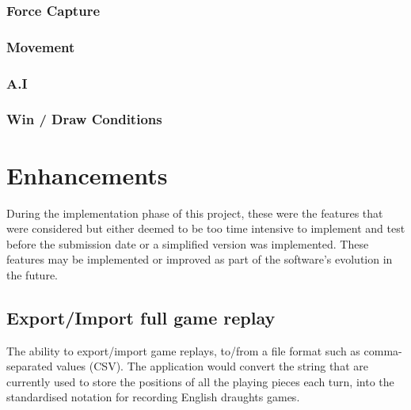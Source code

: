 \documentclass[10pt, a4paper]{article}
\begin{document}
    
    \subsubsection{Force Capture}  
    
    \subsubsection{Movement}
     
    
    \subsubsection{A.I}
    
    \subsubsection{Win / Draw Conditions}
    
    
    
    
    
    

    
    
    
    \section{Enhancements}
    During the implementation phase of this project, these were the features that were considered but either deemed to be too time intensive to implement and test before the submission date or a simplified version was implemented. These features may be implemented or improved as part of the software's evolution in the future. 
    
    \subsection{Export/Import full game replay}
    The ability to export/import game replays, to/from a file format such as comma-separated values (CSV).
    \newline   
    The application would convert the string that are currently used to store the positions of all the playing pieces each turn, into the standardised notation for recording English draughts games.
    
\end{document}
